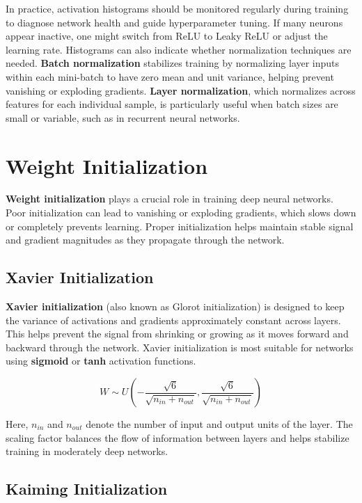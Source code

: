 \documentclass{article}
\begin{document}
In practice, activation histograms should be monitored regularly during training to diagnose network health and guide hyperparameter tuning. If many neurons appear inactive, one might switch from ReLU to Leaky ReLU or adjust the learning rate. Histograms can also indicate whether normalization techniques are needed. \textbf{Batch normalization} stabilizes training by normalizing layer inputs within each mini-batch to have zero mean and unit variance, helping prevent vanishing or exploding gradients. \textbf{Layer normalization}, which normalizes across features for each individual sample, is particularly useful when batch sizes are small or variable, such as in recurrent neural networks.

\section{Weight Initialization}

\textbf{Weight initialization} plays a crucial role in training deep neural networks. Poor initialization can lead to vanishing or exploding gradients, which slows down or completely prevents learning. Proper initialization helps maintain stable signal and gradient magnitudes as they propagate through the network.

\subsection{Xavier Initialization}

\textbf{Xavier initialization} (also known as Glorot initialization) is designed to keep the variance of activations and gradients approximately constant across layers. This helps prevent the signal from shrinking or growing as it moves forward and backward through the network. Xavier initialization is most suitable for networks using \textbf{sigmoid} or \textbf{tanh} activation functions.

\[
W \sim U\left(-\frac{\sqrt{6}}{\sqrt{n_{in} + n_{out}}}, \frac{\sqrt{6}}{\sqrt{n_{in} + n_{out}}}\right)
\]

Here, \(n_{in}\) and \(n_{out}\) denote the number of input and output units of the layer. The scaling factor balances the flow of information between layers and helps stabilize training in moderately deep networks.

\subsection{Kaiming Initialization}
\end{document}
